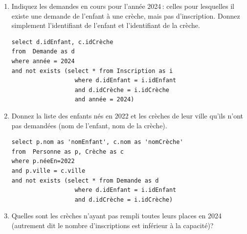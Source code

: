 \begin{enumerate}
\begin{solution}
 \begin{small}
\begin{verbatim}
select e.nom as 'nomEnfant',  p.nom as 'nomPuericultrice'
from  Personne as e left outer join 
        (Inscription as i join Personne as p on i.idPuericultrice=p.idPersonne)
       on  i.idEnfant = e.idPersonne
where néeEn=2022
\end{verbatim}
\end{small}
\end{solution}
 
  \item Indiquez les demandes en cours pour l'année 2024\,: celles pour lesquelles il existe une 
  demande de l'enfant à une crèche, mais pas d'inscription. Donnez simplement
  l'identifiant de l'enfant et l'identifiant de la crèche.
 
\begin{solution}
 \begin{small}
\begin{verbatim}
select d.idEnfant, c.idCrèche
from  Demande as d
where année = 2024
and not exists (select * from Inscription as i
                  where d.idEnfant = i.idEnfant
                  and d.idCrèche = i.idCrèche
                  and année = 2024)
\end{verbatim}
\end{small}
\end{solution}
 
  \item Donnez la liste des enfants nés en 2022 et les crèches de leur ville
     qu'ils n'ont pas demandées (nom de l'enfant, nom de la crèche).

\begin{solution}
\begin{small}
\begin{verbatim}
select p.nom as 'nomEnfant', c.nom as 'nomCrèche'
from  Personne as p, Crèche as c
where p.néeEn=2022
and p.ville = c.ville
and not exists (select * from Demande as d
                  where d.idEnfant = i.idEnfant
                  and d.idCrèche = i.idCrèche)
\end{verbatim}
\end{small}
\end{solution}
 
  \item Quelles sont les crèches n'ayant pas rempli toutes leurs places
  en 2024 (autrement dit  le nombre d'inscriptions est inférieur à la capacité)?


\end{enumerate}
